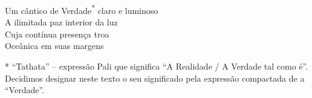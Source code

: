 \cleartorecto
\thispagestyle{empty}

\mbox{}
\vfill

{\centering

Um cântico de Verdade\textsuperscript{*} claro e luminoso\\
A ilimitada paz interior da luz\\
Cuja contínua presença troa\\
Oceânica em suas margens

}

\vfill

\noindent
{\footnotesize
* ``Tathata'' -- expressão Pali que significa ``A Realidade / A Verdade tal
como é''. Decidimos designar neste texto o seu significado pela expressão
compactada de a ``Verdade''.
}

